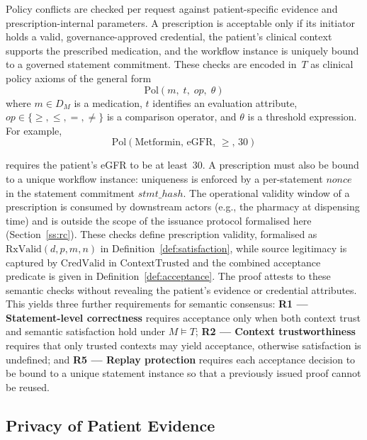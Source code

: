 \documentclass[journal]{IEEEtran}
\begin{document}
Policy conflicts are checked per request against patient-specific evidence and prescription-internal parameters. A prescription is acceptable only if its initiator holds a valid, governance-approved credential, the patient's clinical context supports the prescribed medication, and the workflow instance is uniquely bound to a governed statement commitment. These checks are encoded in~$T$ as clinical policy axioms of the general form
\begin{equation}
  \mathrm{Pol}(m,\; t,\; \mathit{op},\; \theta)
  \label{eq:pol}
\end{equation}
where $m \in D_M$ is a medication, $t$ identifies an evaluation attribute, $\mathit{op} \in \{\geq, \leq, =, \neq\}$ is a comparison operator, and $\theta$ is a threshold expression. For example,
\begin{equation}
  \mathrm{Pol}(\text{Metformin},\, \text{eGFR},\, {\geq},\, 30)
  \label{eq:pol-egfr}
\end{equation}

requires the patient's eGFR to be at least~30. A prescription must also be bound to a unique workflow instance: uniqueness is enforced by a per-statement $\mathit{nonce}$ in the statement commitment $\mathit{stmt\_hash}$. The operational validity window of a prescription is consumed by downstream actors (e.g., the pharmacy at dispensing time) and is outside the scope of the issuance protocol formalised here (Section~\ref{ss:rc}). These checks define prescription validity, formalised as $\mathrm{RxValid}(d, p, m, n)$ in Definition~\ref{def:satisfaction}, while source legitimacy is captured by $\mathrm{CredValid}$ in $\mathrm{ContextTrusted}$ and the combined acceptance predicate is given in Definition~\ref{def:acceptance}. The proof attests to these semantic checks without revealing the patient's evidence or credential attributes. This yields three further requirements for semantic consensus: \textbf{R1 --- Statement-level correctness} requires acceptance only when both context trust and semantic satisfaction hold under $M \models T$; \textbf{R2 --- Context trustworthiness} requires that only trusted contexts may yield acceptance, otherwise satisfaction is undefined; and \textbf{R5 --- Replay protection} requires each acceptance decision to be bound to a unique statement instance so that a previously issued proof cannot be reused.

\subsection{Privacy of Patient Evidence}
\label{sec:privacy-requirements}
\end{document}
